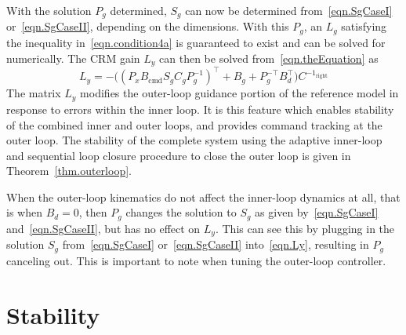 \documentclass[journal]{IEEEtran}
\theoremstyle{innercustomthm}
\begin{document}
  With the solution $P_{g}$ determined, $S_{g}$ can now be determined from\ \eqref{eqn.SgCaseI} or\ \eqref{eqn.SgCaseII}, depending on the dimensions.
  With this $P_{g}$, an $L_{g}$ satisfying the inequality in\ \eqref{eqn.condition4a} is guaranteed to exist and can be solved for numerically.
  The CRM gain $L_{y}$ can then be solved from\ \eqref{eqn.theEquation} as
  {%
    \small
    \begin{equation}
      \label{eqn.Ly}
      L_{y}
      =
      -\bigr((P_{x}B_{\text{cmd}}S_{g}C_{g}P_{g}^{-1})^{\top} + B_{g} + P_{g}^{-\top}B_{d}^{\top}\bigr)C^{-1_{\text{right}}}
    \end{equation}
  }%
  The matrix $L_{y}$ modifies the outer-loop guidance portion of the reference model in response to errors within the inner loop.
  It is this feature which enables stability of the combined inner and outer loops, and provides command tracking at the outer loop.
  The stability of the complete system using the adaptive inner-loop and sequential loop closure procedure to close the outer loop is given in Theorem~\ref{thm.outerloop}.

  \begin{rem-dan}
    When the outer-loop kinematics do not affect the inner-loop dynamics at all, that is when $B_{d}=0$, then $P_{g}$ changes the solution to $S_{g}$ as given by\ \eqref{eqn.SgCaseI} and\ \eqref{eqn.SgCaseII}, but has no effect on $L_{y}$.
    This can see this by plugging in the solution $S_{g}$ from\ \eqref{eqn.SgCaseI} or\ \eqref{eqn.SgCaseII} into\ \eqref{eqn.Ly}, resulting in $P_{g}$ canceling out.
    This is important to note when tuning the outer-loop controller.
  \end{rem-dan}


  \section{Stability}
\end{document}
